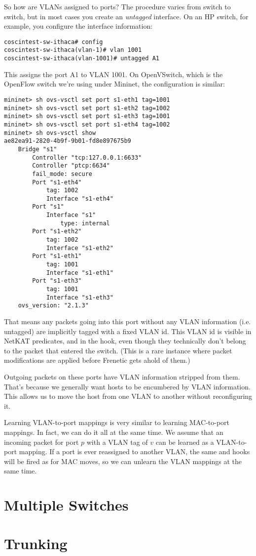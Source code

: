 So how are VLANs assigned to ports?  The procedure varies from switch to switch, but in most cases you
create an \emph{untagged} interface.  On an HP switch, for example, you configure the interface information:

\begin{verbatim}
coscintest-sw-ithaca# config
coscintest-sw-ithaca(vlan-1)# vlan 1001
coscintest-sw-ithaca(vlan-1001)# untagged A1
\end{verbatim}

This assigns the port A1 to VLAN 1001.  On OpenVSwitch, which is the OpenFlow switch we're using under Mininet, 
the configuration is similar:

\begin{verbatim}
mininet> sh ovs-vsctl set port s1-eth1 tag=1001
mininet> sh ovs-vsctl set port s1-eth2 tag=1002
mininet> sh ovs-vsctl set port s1-eth3 tag=1001
mininet> sh ovs-vsctl set port s1-eth4 tag=1002
mininet> sh ovs-vsctl show
ae82ea91-2820-4b9f-9b01-fd8e897675b9
    Bridge "s1"
        Controller "tcp:127.0.0.1:6633"
        Controller "ptcp:6634"
        fail_mode: secure
        Port "s1-eth4"
            tag: 1002
            Interface "s1-eth4"
        Port "s1"
            Interface "s1"
                type: internal
        Port "s1-eth2"
            tag: 1002
            Interface "s1-eth2"
        Port "s1-eth1"
            tag: 1001
            Interface "s1-eth1"
        Port "s1-eth3"
            tag: 1001
            Interface "s1-eth3"
    ovs_version: "2.1.3"
\end{verbatim}

That means any packets going into this port without any VLAN
information (i.e. untagged) are implicitly tagged with a fixed VLAN id.   This VLAN id is visible in NetKAT
predicates, and in the  hook, even though they technically don't belong to the 
packet that entered the switch.  (This is a rare instance where packet modifications are applied
before Frenetic gets ahold of them.)

Outgoing packets on these ports have VLAN information stripped from them.  That's because we generally 
want hosts to be encumbered by VLAN information.  This allows us to move the host from one VLAN to another
without reconfiguring it.  

Learning VLAN-to-port mappings is very similar to learning MAC-to-port mappings.  In fact, 
we can do it all at the
same time.  We assume that an incoming packet for port $p$ with a VLAN tag of $v$ can be learned as a 
VLAN-to-port mapping.  If a port is ever reassigned to another VLAN, the same  and
 hooks will be fired as for MAC moves, so we can unlearn the VLAN mappings at the same
time.  

\section{Multiple Switches}

\section{Trunking}

